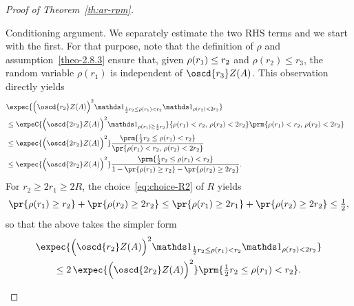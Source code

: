 \begin{proof}[Proof of Theorem~\ref{th:ar-rpm}]
\begin{step}{Conditioning argument.}
We separately estimate the two RHS terms and we start with the first. For that purpose, note that the definition of $\rho$ and assumption~\eqref{theo-2.8.3} ensure that, given $\rho(r_1)\linebreak\le r_2$ and $\rho(r_2)\le r_3$, the random variable $\rho(r_1)$ is independent of $\oscd{r_3}Z(A)$. This observation directly yields
\begin{align*}
\lefteqn{\expec{\Big(\oscd{r_2}Z(A)\Big)^2\mathds1_{\frac12r_2\le\rho(r_1)<r_2}\mathds1_{\rho(r_2)<2r_2}}}\\
&\le\expeC{\Big(\oscd{2r_2}Z(A)\Big)^2\mathds1_{\rho(r_1)\ge\frac12r_2}}{\rho(r_1)<r_2,\,\rho(r_2)<2r_2}\prm{\rho(r_1)<r_2,\,\rho(r_2)<2r_2}\\
&\le\expec{\Big(\oscd{2r_2}Z(A)\Big)^2}\frac{\prm{\frac12 r_2\le\rho(r_1)<r_2}}{\pr{\rho(r_1)<r_2,\,\rho(r_2)<2r_2}}\\
&\le\expec{\Big(\oscd{2r_2}Z(A)\Big)^2}\frac{\prm{\frac12 r_2\le\rho(r_1)<r_2}}{1-\pr{\rho(r_1)\ge r_2}-\pr{\rho(r_2)\ge2r_2}}.
\end{align*}
For $r_2\ge2r_1\ge2R$, the choice~\eqref{eq:choice-R2} of $R$ yields
\[
\pr{\rho(r_1)\ge r_2}+\pr{\rho(r_2)\ge2r_2}\le\pr{\rho(r_1)\ge 2r_1}+\pr{\rho(r_2)\ge2r_2}\le\tfrac12,
\]
so that the above takes the simpler form
\begin{multline}\label{eq:bound-base}
{\expec{\Big(\oscd{r_2}Z(A)\Big)^2\mathds1_{\frac12r_2\le\rho(r_1)<r_2}\mathds1_{\rho(r_2)<2r_2}}}\\
\le2\,\expec{\Big(\oscd{2r_2}Z(A)\Big)^2}\prm{\tfrac12r_2\le\rho(r_1)<r_2}.
\end{multline}



\end{step}
\end{proof}
